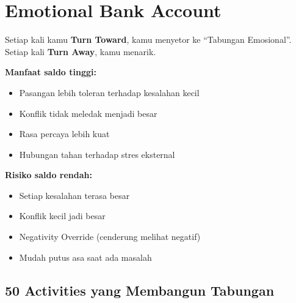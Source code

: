 \section{Emotional Bank Account}

\begin{praktikbox}
Setiap kali kamu \textbf{Turn Toward}, kamu menyetor ke ``Tabungan Emosional''. Setiap kali \textbf{Turn Away}, kamu menarik.

\textbf{Manfaat saldo tinggi:}
\begin{itemize}
    \item Pasangan lebih toleran terhadap kesalahan kecil
    \item Konflik tidak meledak menjadi besar
    \item Rasa percaya lebih kuat
    \item Hubungan tahan terhadap stres eksternal
\end{itemize}

\textbf{Risiko saldo rendah:}
\begin{itemize}
    \item Setiap kesalahan terasa besar
    \item Konflik kecil jadi besar
    \item Negativity Override (cenderung melihat negatif)
    \item Mudah putus asa saat ada masalah
\end{itemize}
\end{praktikbox}

\subsection{50 Activities yang Membangun Tabungan}

